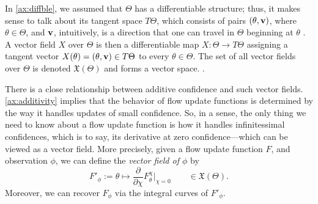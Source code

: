 In \cref{ax:diffble}, we assumed that $\Theta$ has a differentiable 
structure; thus, it makes sense to talk about its tangent space
$T\Theta$,
which consists of pairs $(\theta, \mathbf{v})$, where
$\theta \in \Theta$, and $\mathbf{v}$,
intuitively, is a direction that one can travel in $\Theta$ beginning at $\theta$
\parencite[\S3]{lee2013smooth}.
%
%
A vector field $X$ over $\Theta$ is then
a 
differentiable
map $X : \Theta \to T \Theta$ 
assigning a tangent vector $X(\theta) = (\theta, \mathbf{v}) \in T\Theta$ 
to every $\theta \in \Theta$.
The set of all vector fields over $\Theta$ is denoted $\mathfrak X(\Theta)$
 and forms a vector space.
\parencite[\S8]{lee2013smooth}
\unskip.

There is a close relationship between additive confidence and such vector fields.
\cref{ax:additivity} 
implies that the behavior of flow update functions is determined by the
way it handles updates of small confidence.
So, in a sense, the only thing we need to know about
a flow update function is how it handles infinitessimal confidences,
which is to say, its derivative at zero confidence---which can be
viewed as a vector field.
More precisely, 
given a flow update function $F$, and observation $\phi$, 
we can define the \emph{vector field of $\phi$} by
\begin{equation}
	F'_\phi 
	:= 
	\theta \mapsto 
	\frac{\partial}{\partial \chi} F_{\theta}^{\chi} \Big|_{\chi=0}
	\qquad\in  \mathfrak X(\Theta)
	.
	\label{eq:f-field}
\end{equation}
Moreover, we can recover $F_\phi$ via the integral curves of $F'_\phi$.

